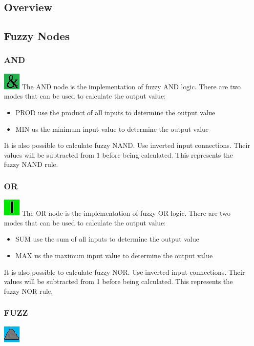 \documentclass{scrartcl}
\begin{document}
\subsection{Overview}
\subsection{Fuzzy Nodes}
\subsubsection{AND}
\includegraphics{../gui/pics/editor_logo_and.png}
The AND node is the implementation of fuzzy AND logic. There are two modes that can be used to calculate the output value:
\begin{itemize}
\item PROD use the product of all inputs to determine the output value
\item MIN us the minimum input value to determine the output value
\end{itemize}
It is also possible to calculate fuzzy NAND. Use inverted input connections. Their values will be subtracted from 1 before being calculated. This represents the fuzzy NAND rule.
\subsubsection{OR}
\includegraphics{../gui/pics/editor_logo_or.png}
The OR node is the implementation of fuzzy OR logic. There are two modes that can be used to calculate the output value:
\begin{itemize}
\item SUM use the sum of all inputs to determine the output value
\item MAX us the maximum input value to determine the output value
\end{itemize}
It is also possible to calculate fuzzy NOR. Use inverted input connections. Their values will be subtracted from 1 before being calculated. This represents the fuzzy NOR rule.
\subsubsection{FUZZ}
\includegraphics{../gui/pics/editor_logo_fuzz.png}
\end{document}
